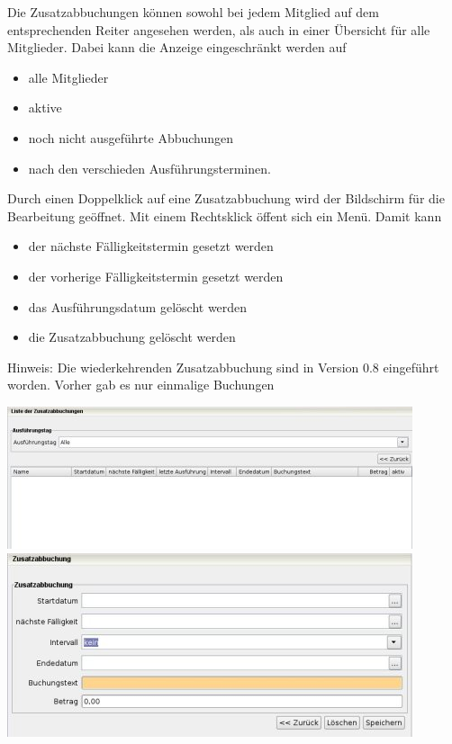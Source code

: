 \documentclass[a4paper,BCOR30mm,DIV14,pdftex,liststotoc,footsepline,openany]{scrbook}
\begin{document}
Die Zusatzabbuchungen können sowohl bei jedem Mitglied auf dem entsprechenden Reiter angesehen werden, als auch in einer Übersicht für alle Mitglieder. Dabei kann die Anzeige eingeschränkt werden auf

\begin{itemize}
 \item alle Mitglieder
 \item aktive
 \item noch nicht ausgeführte Abbuchungen
 \item nach den verschieden Ausführungsterminen.
\end{itemize}

Durch einen Doppelklick auf eine Zusatzabbuchung wird der Bildschirm für die Bearbeitung geöffnet. Mit einem Rechtsklick öffent sich ein Menü. Damit kann


\begin{itemize}
 \item der nächste Fälligkeitstermin gesetzt werden
 \item der vorherige Fälligkeitstermin gesetzt werden
 \item das Ausführungsdatum gelöscht werden
 \item die Zusatzabbuchung gelöscht werden
\end{itemize}

Hinweis: Die wiederkehrenden Zusatzabbuchung sind in Version 0.8 eingeführt worden. Vorher gab es nur einmalige Buchungen

\includegraphics{./screenshots/listezusatzabbuchungen.jpg}\\


\includegraphics{./screenshots/zusatzabbuchung.jpg}\\
\end{document}
